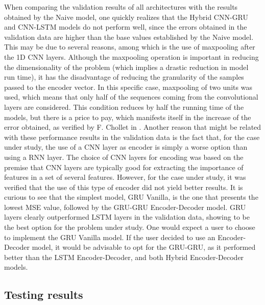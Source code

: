 When comparing the validation results of all architectures with the results obtained by the Naive model, one quickly realizes that the Hybrid \ac{CNN}-\ac{GRU} and \ac{CNN}-\ac{LSTM} models do not perform well, since the errors obtained in the validation data are higher than the base values established by the Naive model. This may be due to several reasons, among which is the use of maxpooling after the \ac{1D CNN} layers. Although the maxpooling operation is important in reducing the dimensionality of the problem (which implies a drastic reduction in model run time), it has the disadvantage of reducing the granularity of the samples passed to the encoder vector. In this specific case, maxpooling of two units was used, which means that only half of the sequences coming from the convolutional layers are considered. This condition reduces by half the running time of the models, but there is a price to pay, which manifests itself in the increase of the error obtained, as verified by F. Chollet in \cite{cnn1}. Another reason that might be related with these performance results in the validation data is the fact that, for the case under study, the use of a \ac{CNN} layer as encoder is simply a worse option than using a \ac{RNN} layer. The choice of \ac{CNN} layers for encoding was based on the premise that \ac{CNN} layers are typically good for extracting the importance of features in a set of several features. However, for the case under study, it was verified that the use of this type of encoder did not yield better results. It is curious to see that the simplest model, \ac{GRU} Vanilla, is the one that presents the lowest \ac{MSE} value, followed by the \ac{GRU}-\ac{GRU} Encoder-Decoder model. \ac{GRU} layers clearly outperformed \ac{LSTM} layers in the validation data, showing to be the best option for the problem under study. One would expect a user to choose to implement the \ac{GRU} Vanilla model. If the user decided to use an Encoder-Decoder model, it would be advisable to opt for the \ac{GRU}-\ac{GRU}, as it performed better than the \ac{LSTM} Encoder-Decoder, and both Hybrid Encoder-Decoder models. 

\subsection{Testing results}

